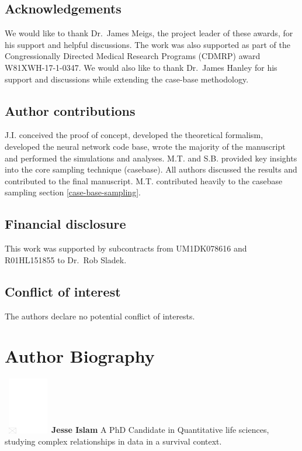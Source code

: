 \documentclass[APA,LATO1COL]{WileyNJD-v2}
\begin{document}
\hypertarget{acknowledgements}{%
\subsection*{Acknowledgements}\label{acknowledgements}}

We would like to thank Dr.~James Meigs, the project
leader of these awards, for his support and helpful discussions. The
work was also supported as part of the Congressionally Directed Medical
Research Programs (CDMRP) award W81XWH-17-1-0347. We would also like to
thank Dr.~James Hanley for his support and discussions while extending
the case-base methodology.

\subsection*{Author contributions}

J.I. conceived the proof of concept, developed the theoretical formalism, developed the neural network code base, wrote the majority of the manuscript and performed the simulations and analyses. M.T. and S.B. provided key insights into the core sampling technique (casebase). All authors discussed the results and contributed to the final manuscript. M.T. contributed heavily to the casebase sampling section \ref{case-base-sampling}.

\subsection*{Financial disclosure}

This work was supported by subcontracts from UM1DK078616 and R01HL151855
to Dr.~Rob Sladek. 

\subsection*{Conflict of interest}

The authors declare no potential conflict of interests.


\appendix
%


\section*{Author Biography}

\begin{biography}{\includegraphics[width=60pt,height=70pt,draft]{empty}}{\textbf{Jesse Islam} A PhD Candidate in Quantitative life sciences, studying complex relationships in data in a survival context.}
\end{biography}
\end{document}
